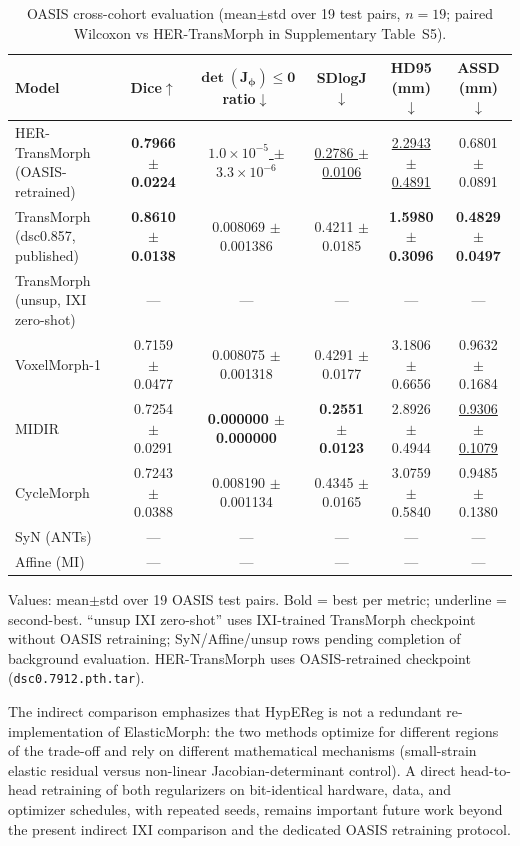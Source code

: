 \documentclass[jimaging,article,submit,pdftex,moreauthors]{Definitions/mdpi}
\begin{document}
\begin{table}[H]
\caption{OASIS cross-cohort evaluation (mean$\pm$std over 19 test pairs, $n{=}19$; paired Wilcoxon vs HER-TransMorph in Supplementary Table~S5).\label{tab:oasis_main}}
\centering
\scriptsize
\setlength{\tabcolsep}{3pt}
\begin{tabularx}{\textwidth}{lccccc}
\toprule
\textbf{Model} & \textbf{Dice$\uparrow$} & $\boldsymbol{\det(J_\phi)\le 0}$ \textbf{ratio$\downarrow$} & \textbf{SDlogJ$\downarrow$} & \textbf{HD95 (mm)$\downarrow$} & \textbf{ASSD (mm)$\downarrow$}\\
\midrule
HER-TransMorph (OASIS-retrained) & \textbf{0.7966 \(\pm\) 0.0224} & \underline{$1.0\times10^{-5}$ \(\pm\) $3.3\times10^{-6}$} & \underline{0.2786 \(\pm\) 0.0106} & \underline{2.2943 \(\pm\) 0.4891} & 0.6801 \(\pm\) 0.0891 \\
TransMorph (dsc0.857, published) & \textbf{0.8610 \(\pm\) 0.0138} & 0.008069 \(\pm\) 0.001386 & 0.4211 \(\pm\) 0.0185 & \textbf{1.5980 \(\pm\) 0.3096} & \textbf{0.4829 \(\pm\) 0.0497} \\
TransMorph (unsup, IXI zero-shot) & --- & --- & --- & --- & --- \\
VoxelMorph-1 & 0.7159 \(\pm\) 0.0477 & 0.008075 \(\pm\) 0.001318 & 0.4291 \(\pm\) 0.0177 & 3.1806 \(\pm\) 0.6656 & 0.9632 \(\pm\) 0.1684 \\
MIDIR & 0.7254 \(\pm\) 0.0291 & \textbf{0.000000 \(\pm\) 0.000000} & \textbf{0.2551 \(\pm\) 0.0123} & 2.8926 \(\pm\) 0.4944 & \underline{0.9306 \(\pm\) 0.1079} \\
CycleMorph & 0.7243 \(\pm\) 0.0388 & 0.008190 \(\pm\) 0.001134 & 0.4345 \(\pm\) 0.0165 & 3.0759 \(\pm\) 0.5840 & 0.9485 \(\pm\) 0.1380 \\
SyN (ANTs) & --- & --- & --- & --- & --- \\
Affine (MI) & --- & --- & --- & --- & --- \\
\bottomrule
\end{tabularx}
\parbox{\textwidth}{\footnotesize Values: mean\(\pm\)std over 19 OASIS test pairs. Bold = best per metric; underline = second-best. ``unsup IXI zero-shot'' uses IXI-trained TransMorph checkpoint without OASIS retraining; SyN/Affine/unsup rows pending completion of background evaluation. HER-TransMorph uses OASIS-retrained checkpoint (\texttt{dsc0.7912.pth.tar}).}
\end{table}

The indirect comparison emphasizes that HypEReg is not a redundant re-implementation of ElasticMorph: the two methods optimize for different regions of the trade-off and rely on different mathematical mechanisms (small-strain elastic residual versus non-linear Jacobian-determinant control). A direct head-to-head retraining of both regularizers on bit-identical hardware, data, and optimizer schedules, with repeated seeds, remains important future work beyond the present indirect IXI comparison and the dedicated OASIS retraining protocol.
\end{document}
